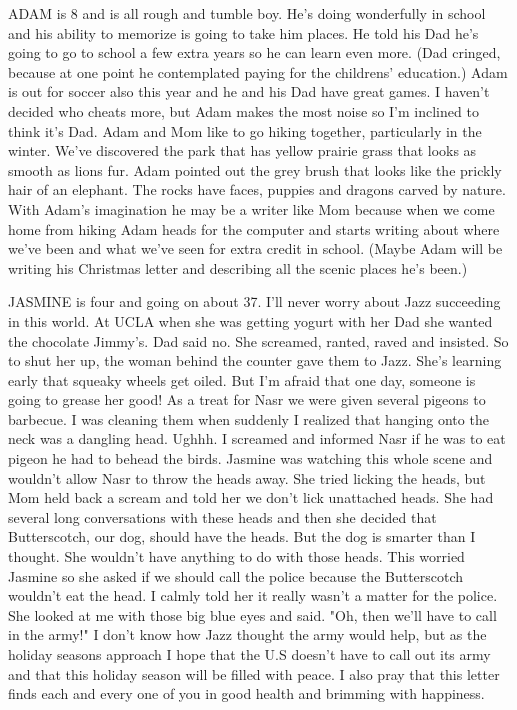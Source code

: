 ADAM is 8 and is all rough and tumble boy. He's doing wonderfully in school and his ability to memorize is going to take him places. He told his
Dad he's going to go to school a few extra years so he can learn even more. (Dad cringed, because at one point he contemplated paying for the
childrens' education.) Adam is out for soccer also this year and he and his Dad have great games. I haven't decided who cheats more, but Adam
makes the most noise so I'm inclined to think it's Dad. Adam and Mom like to go hiking together, particularly in the winter. We've discovered
the park that has yellow prairie grass that looks as smooth as lions fur. Adam pointed out the grey brush that looks like the prickly hair of an
elephant. The rocks have faces, puppies and dragons carved by nature. With Adam's imagination he may be a writer like Mom because when we come
home from hiking Adam heads for the computer and starts writing about where we've been and what we've seen for extra credit in school. (Maybe
Adam will be writing his Christmas letter and describing all the scenic places he's been.)

JASMINE is four and going on about 37. I'll never worry about Jazz succeeding in this world. At UCLA when she was getting yogurt with her Dad
she wanted the chocolate Jimmy's. Dad said no. She screamed, ranted, raved and insisted. So to shut her up, the woman behind the counter gave
them to Jazz. She's learning early that squeaky wheels get oiled. But I'm afraid that one day, someone is going to grease her good! As a treat
for Nasr we were given several pigeons to barbecue. I was cleaning them when suddenly I realized that hanging onto the neck was a dangling head.
Ughhh. I screamed and informed Nasr if he was to eat pigeon he had to behead the birds. Jasmine was watching this whole scene and wouldn't allow
Nasr to throw the heads away. She tried licking the heads, but Mom held back a scream and told her we don't lick unattached heads. She had
several long conversations with these heads and then she decided that Butterscotch, our dog, should have the heads. But the dog is smarter than
I thought. She wouldn't have anything to do with those heads. This worried Jasmine so she asked if we should call the police because the
Butterscotch wouldn't eat the head. I calmly told her it really wasn't a matter for the police. She looked at me with those big blue eyes and
said. "Oh, then we'll have to call in the army!" I don't know how Jazz thought the army would help, but as the holiday seasons approach I hope
that the U.S doesn't have to call out its army and that this holiday season will be filled with peace. I also pray that this letter finds each
and every one of you in good health and brimming with happiness.




%
